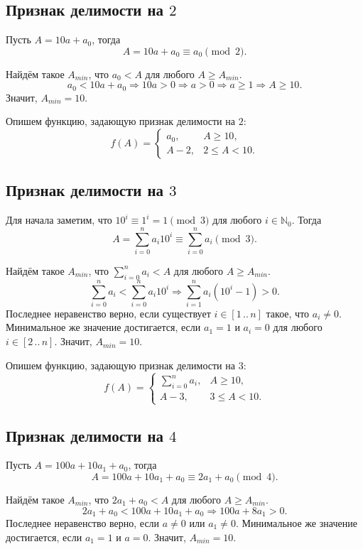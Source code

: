 \documentclass[14pt, a4paper]{extarticle}
\theoremstyle{definition}
\begin{document}
\subsection{Признак делимости на $2$}

	Пусть $A=10a+a_0$, тогда
	$$A=10a+a_0\equiv a_0\pmod2.$$

	Найдём такое $A_{min}$, что $a_0<A$ для любого $A\geqslant A_{min}$. 
	$$a_0<10a+a_0\Rightarrow10a>0\Rightarrow a>0\Rightarrow a\geqslant1\Rightarrow A\geqslant10.$$
	Значит, $A_{min}=10$.

	Опишем функцию, задающую признак делимости на $2$:
	$$f(A)=\begin{cases}
		a_0,&A\geqslant10,\\
		A-2,&2\leqslant A<10.
	\end{cases}$$

\subsection{Признак делимости на $3$}

	Для начала заметим, что $10^i\equiv1^i=1\pmod3$ для любого $i\in\mathbb{N}_0$. Тогда
	$$A=\sum_{i=0}^na_i10^i\equiv\sum_{i=0}^na_i\pmod3.$$

	Найдём такое $A_{min}$, что $\sum_{i=0}^na_i<A$ для любого $A\geqslant A_{min}$. 
	$$\sum_{i=0}^na_i<\sum_{i=0}^na_i10^i\Rightarrow\sum_{i=1}^na_i(10^i-1)>0.$$
	Последнее неравенство верно, если существует $i\in[1\,..\,n]$ такое, что $a_i\neq0$. Минимальное же значение достигается, если $a_1=1$ и $a_i=0$ для любого $i\in[2\,..\,n]$. Значит, $A_{min}=10$.

	Опишем функцию, задающую признак делимости на $3$:
	$$f(A)=\begin{cases}
		\sum_{i=0}^na_i,&A\geqslant10,\\
		A-3,&3\leqslant A<10.
	\end{cases}$$

\subsection{Признак делимости на $4$}

	Пусть $A=100a+10a_1+a_0$, тогда
	$$A=100a+10a_1+a_0\equiv2a_1+a_0\pmod4.$$

	Найдём такое $A_{min}$, что $2a_1+a_0<A$ для любого $A\geqslant A_{min}$. 
	$$2a_1+a_0<100a+10a_1+a_0\Rightarrow100a+8a_1>0.$$
	Последнее неравенство верно, если $a\neq0$ или $a_1\neq0$. Минимальное же значение достигается, если $a_1=1$ и $a=0$. Значит, $A_{min}=10$.
\end{document}

